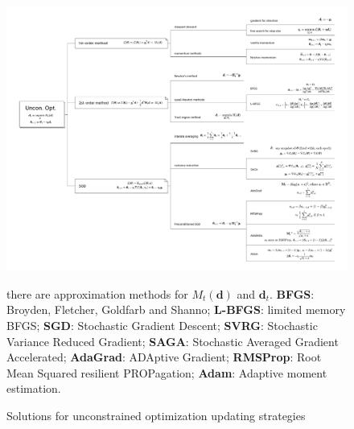\begin{figure}[htpb]
    \centering
    \includegraphics[width=\textwidth]{figs/unconopt.pdf}
    \caption{Solutions for unconstrained optimization updating strategies}
    {\footnotesize there are approximation methods for $M_t(\bm{d})$ and $\bm{d}_t$.
    \textbf{BFGS}: Broyden, Fletcher, Goldfarb and Shanno;
    \textbf{L-BFGS}: limited memory BFGS;
    \textbf{SGD}: Stochastic Gradient Descent;
    \textbf{SVRG}: Stochastic Variance Reduced Gradient;
    \textbf{SAGA}: Stochastic Averaged Gradient Accelerated;
    \textbf{AdaGrad}: ADAptive Gradient;
    \textbf{RMSProp}: Root Mean Squared resilient PROPagation;
    \textbf{Adam}: Adaptive moment estimation.
    }
    
    \label{fig:unconopt}
\end{figure}